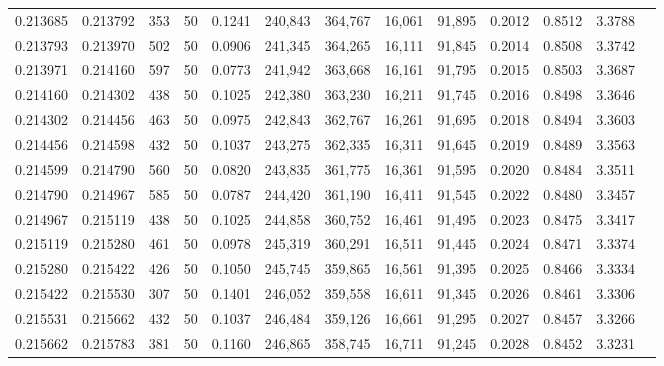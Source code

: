 \begin{tabular}{rrrrrrrrrrrrr}
0.213685 & 0.213792 &   353 &  50 &                                     0.1241 & 240,843 & 364,767 &  16,061 &  91,895 & 0.2012 & 0.8512 & 3.3788 \\
0.213793 & 0.213970 &   502 &  50 &                                     0.0906 & 241,345 & 364,265 &  16,111 &  91,845 & 0.2014 & 0.8508 & 3.3742 \\
0.213971 & 0.214160 &   597 &  50 &                                     0.0773 & 241,942 & 363,668 &  16,161 &  91,795 & 0.2015 & 0.8503 & 3.3687 \\
0.214160 & 0.214302 &   438 &  50 &                                     0.1025 & 242,380 & 363,230 &  16,211 &  91,745 & 0.2016 & 0.8498 & 3.3646 \\
0.214302 & 0.214456 &   463 &  50 &                                     0.0975 & 242,843 & 362,767 &  16,261 &  91,695 & 0.2018 & 0.8494 & 3.3603 \\
0.214456 & 0.214598 &   432 &  50 &                                     0.1037 & 243,275 & 362,335 &  16,311 &  91,645 & 0.2019 & 0.8489 & 3.3563 \\
0.214599 & 0.214790 &   560 &  50 &                                     0.0820 & 243,835 & 361,775 &  16,361 &  91,595 & 0.2020 & 0.8484 & 3.3511 \\
0.214790 & 0.214967 &   585 &  50 &                                     0.0787 & 244,420 & 361,190 &  16,411 &  91,545 & 0.2022 & 0.8480 & 3.3457 \\
0.214967 & 0.215119 &   438 &  50 &                                     0.1025 & 244,858 & 360,752 &  16,461 &  91,495 & 0.2023 & 0.8475 & 3.3417 \\
0.215119 & 0.215280 &   461 &  50 &                                     0.0978 & 245,319 & 360,291 &  16,511 &  91,445 & 0.2024 & 0.8471 & 3.3374 \\
0.215280 & 0.215422 &   426 &  50 &                                     0.1050 & 245,745 & 359,865 &  16,561 &  91,395 & 0.2025 & 0.8466 & 3.3334 \\
0.215422 & 0.215530 &   307 &  50 &                                     0.1401 & 246,052 & 359,558 &  16,611 &  91,345 & 0.2026 & 0.8461 & 3.3306 \\
0.215531 & 0.215662 &   432 &  50 &                                     0.1037 & 246,484 & 359,126 &  16,661 &  91,295 & 0.2027 & 0.8457 & 3.3266 \\
0.215662 & 0.215783 &   381 &  50 &                                     0.1160 & 246,865 & 358,745 &  16,711 &  91,245 & 0.2028 & 0.8452 & 3.3231 \\

\end{tabular}
